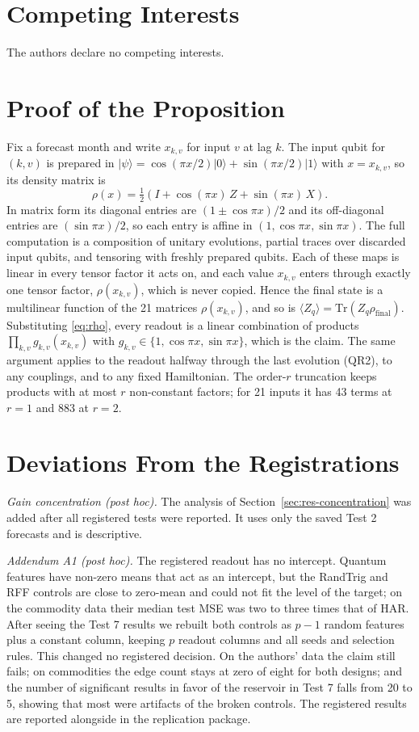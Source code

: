 \documentclass{ieeeaccess}
\begin{document}
\section*{Competing Interests}
The authors declare no competing interests.

\appendices
\section{Proof of the Proposition}
\label{app:proof}
Fix a forecast month and write $x_{k,v}$ for input $v$ at lag $k$. The input qubit for $(k,v)$ is prepared in $|\psi\rangle=\cos(\pi x/2)|0\rangle+\sin(\pi x/2)|1\rangle$ with $x=x_{k,v}$, so its density matrix is
\begin{equation}
\rho(x)=\tfrac12\left(I+\cos(\pi x)\,Z+\sin(\pi x)\,X\right).
\label{eq:rho}
\end{equation}
In matrix form its diagonal entries are $(1\pm\cos\pi x)/2$ and its off-diagonal entries are $(\sin\pi x)/2$, so each entry is affine in $(1,\cos\pi x,\sin\pi x)$. The full computation is a composition of unitary evolutions, partial traces over discarded input qubits, and tensoring with freshly prepared qubits. Each of these maps is linear in every tensor factor it acts on, and each value $x_{k,v}$ enters through exactly one tensor factor, $\rho(x_{k,v})$, which is never copied. Hence the final state is a multilinear function of the 21 matrices $\rho(x_{k,v})$, and so is $\langle Z_q\rangle=\mathrm{Tr}(Z_q\rho_\mathrm{final})$. Substituting \eqref{eq:rho}, every readout is a linear combination of products $\prod_{k,v} g_{k,v}(x_{k,v})$ with $g_{k,v}\in\{1,\cos\pi x,\sin\pi x\}$, which is the claim. The same argument applies to the readout halfway through the last evolution (QR2), to any couplings, and to any fixed Hamiltonian. The order-$r$ truncation keeps products with at most $r$ non-constant factors; for 21 inputs it has 43 terms at $r=1$ and 883 at $r=2$.

\section{Deviations From the Registrations}
\label{app:deviations}
\emph{Gain concentration (post hoc).} The analysis of Section~\ref{sec:res-concentration} was added after all registered tests were reported. It uses only the saved Test 2 forecasts and is descriptive.

\emph{Addendum A1 (post hoc).} The registered readout has no intercept. Quantum features have non-zero means that act as an intercept, but the RandTrig and RFF controls are close to zero-mean and could not fit the level of the target; on the commodity data their median test MSE was two to three times that of HAR. After seeing the Test 7 results we rebuilt both controls as $p-1$ random features plus a constant column, keeping $p$ readout columns and all seeds and selection rules. This changed no registered decision. On the authors' data the claim still fails; on commodities the edge count stays at zero of eight for both designs; and the number of significant results in favor of the reservoir in Test 7 falls from 20 to 5, showing that most were artifacts of the broken controls. The registered results are reported alongside in the replication package.
\end{document}
